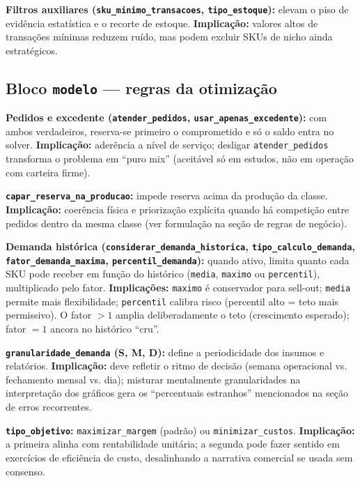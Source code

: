 \documentclass[11pt,a4paper]{article}
\begin{document}
\textbf{Filtros auxiliares (\texttt{sku\_minimo\_transacoes},
\texttt{tipo\_estoque}):} elevam o piso de evidência estatística e o recorte de
estoque. \textbf{Implicação:} valores altos de transações mínimas reduzem ruído,
mas podem excluir SKUs de nicho ainda estratégicos.

\subsection{Bloco \texttt{modelo} --- regras da otimização}

\textbf{Pedidos e excedente (\texttt{atender\_pedidos},
\texttt{usar\_apenas\_excedente}):} com ambos verdadeiros, reserva-se primeiro o
comprometido e só o saldo entra no solver. \textbf{Implicação:} aderência a
nível de serviço; desligar \texttt{atender\_pedidos} transforma o problema em
``puro mix'' (aceitável só em estudos, não em operação com carteira firme).

\textbf{\texttt{capar\_reserva\_na\_producao}:} impede reserva acima da produção
da classe. \textbf{Implicação:} coerência física e priorização explícita quando
há competição entre pedidos dentro da mesma classe (ver formulação na seção de
regras de negócio).

\textbf{Demanda histórica (\texttt{considerar\_demanda\_historica},
\texttt{tipo\_calculo\_demanda}, \texttt{fator\_demanda\_maxima},
\texttt{percentil\_demanda}):} quando ativo, limita quanto cada SKU pode receber
em função do histórico (\texttt{media}, \texttt{maximo} ou
\texttt{percentil}), multiplicado pelo fator. \textbf{Implicações:}
\texttt{maximo} é conservador para sell-out; \texttt{media} permite mais
flexibilidade; \texttt{percentil} calibra risco (percentil alto = teto mais
permissivo). O fator \(>1\) amplia deliberadamente o teto (crescimento esperado);
fator \(=1\) ancora no histórico ``cru''.

\textbf{\texttt{granularidade\_demanda} (S, M, D):} define a periodicidade dos
insumos e relatórios. \textbf{Implicação:} deve refletir o ritmo de decisão
(semana operacional vs. fechamento mensal vs. dia); misturar mentalmente
granularidades na interpretação dos gráficos gera os ``percentuais estranhos''
mencionados na seção de erros recorrentes.

\textbf{\texttt{tipo\_objetivo}:} \texttt{maximizar\_margem} (padrão) ou
\texttt{minimizar\_custos}. \textbf{Implicação:} a primeira alinha com rentabilidade
unitária; a segunda pode fazer sentido em exercícios de eficiência de custo,
desalinhando a narrativa comercial se usada sem consenso.
\end{document}
